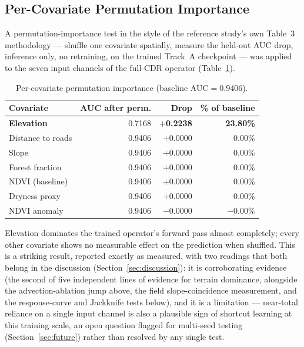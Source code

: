 \documentclass[journal]{IEEEtran}
\begin{document}
\subsection{Per-Covariate Permutation Importance}

A permutation-importance test in the style of the reference study's own Table~3 methodology --- shuffle one covariate spatially, measure the held-out AUC drop, inference only, no retraining, on the trained Track~A checkpoint --- was applied to the seven input channels of the full-CDR operator (Table~\ref{tab:permutation}).

\begin{table}[t]
\centering
\caption{Per-covariate permutation importance (baseline AUC$=$0.9406).}
\label{tab:permutation}
\begin{tabular}{lrrr}
\toprule
\textbf{Covariate} & \textbf{AUC after perm.} & \textbf{Drop} & \textbf{\% of baseline} \\
\midrule
\textbf{Elevation} & 0.7168 & \textbf{$+$0.2238} & \textbf{23.80\%} \\
Distance to roads & 0.9406 & $+$0.0000 & 0.00\% \\
Slope & 0.9406 & $+$0.0000 & 0.00\% \\
Forest fraction & 0.9406 & $+$0.0000 & 0.00\% \\
NDVI (baseline) & 0.9406 & $+$0.0000 & 0.00\% \\
Dryness proxy & 0.9406 & $+$0.0000 & 0.00\% \\
NDVI anomaly & 0.9406 & $-$0.0000 & $-$0.00\% \\
\bottomrule
\end{tabular}
\end{table}

Elevation dominates the trained operator's forward pass almost completely; every other covariate shows no measurable effect on the prediction when shuffled. This is a striking result, reported exactly as measured, with two readings that both belong in the discussion (Section~\ref{sec:discussion}): it is corroborating evidence (the second of five independent lines of evidence for terrain dominance, alongside the advection-ablation jump above, the field slope-coincidence measurement, and the response-curve and Jackknife tests below), and it is a limitation --- near-total reliance on a single input channel is also a plausible sign of shortcut learning at this training scale, an open question flagged for multi-seed testing (Section~\ref{sec:future}) rather than resolved by any single test.
\end{document}

